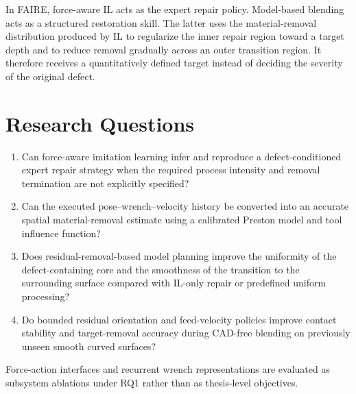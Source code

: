 In FAIRE, force-aware IL acts as the expert repair policy. Model-based blending acts as a structured restoration skill. The latter uses the material-removal distribution produced by IL to regularize the inner repair region toward a target depth and to reduce removal gradually across an outer transition region. It therefore receives a quantitatively defined target instead of deciding the severity of the original defect.

\section{Research Questions}
\begin{enumerate}[label=\textbf{RQ\arabic*:},leftmargin=2.2cm]
  \item Can force-aware imitation learning infer and reproduce a defect-conditioned expert repair strategy when the required process intensity and removal termination are not explicitly specified?
  \item Can the executed pose--wrench--velocity history be converted into an accurate spatial material-removal estimate using a calibrated Preston model and tool influence function?
  \item Does residual-removal-based model planning improve the uniformity of the defect-containing core and the smoothness of the transition to the surrounding surface compared with IL-only repair or predefined uniform processing?
  \item Do bounded residual orientation and feed-velocity policies improve contact stability and target-removal accuracy during CAD-free blending on previously unseen smooth curved surfaces?
\end{enumerate}
Force-action interfaces and recurrent wrench representations are evaluated as subsystem ablations under RQ1 rather than as thesis-level objectives.

